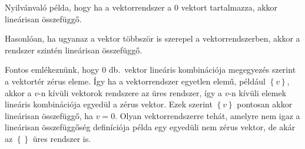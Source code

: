 \documentclass[a4paper, showtrims]{memoir}
\theoremstyle{plain}
\theoremstyle{remark}
\theoremstyle{definition}
\begin{document}
Nyilvánvaló példa, hogy ha a vektorrendszer a $0$ vektort tartalmazza,
akkor lineárisan összefüggő.

Hasonlóan, ha ugyanaz a vektor többször is szerepel a vektorrendszerben, 
akkor a rendszer szintén lineárisan összefüggő.

Fontos emlékeznünk, hogy 0 db.~vektor lineáris kombinációja megegyezés szerint a vektortér zérus eleme.
Így ha a vektorrendszer egyetlen elemű, például $\left\{ v \right\}$, akkor a $v$-n kívüli vektorok rendszere az üres rendszer, így a $v$-n kívüli elemek lineáris kombinációja egyedül a zérus vektor.
Ezek szerint $\left\{ v \right\}$ pontosan akkor lineárisan összefüggő,
ha $v=0$.
Olyan vektorrendszerre tehát, 
amelyre nem igaz a lineárisan összefüggőség definíciója példa egy egyedüli nem zérus vektor,
de akár az $\left\{  \right\}$ üres rendszer is.
\end{document}
